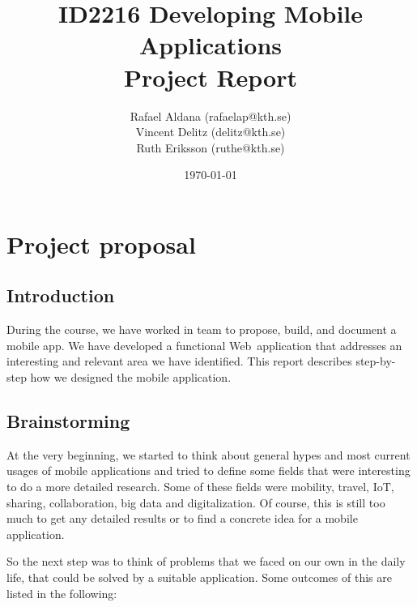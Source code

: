 \documentclass[11pt,twoside,a4paper]{report}
\newcommand{\webOrNative}{Web~}
\begin{document}
\title{ID2216 Developing Mobile Applications\\Project Report}
\author{Rafael Aldana (rafaelap@kth.se)\\Vincent Delitz (delitz@kth.se)\\Ruth Eriksson (ruthe@kth.se)}
\date{\today}
\maketitle

\newpage


\tableofcontents



\newpage

\chapter{Project proposal}

\section{Introduction}

During the course, we have worked in team to propose, build, and document a mobile app. We have developed a functional \webOrNative application that addresses an interesting and relevant area we have identified. This report describes step-by-step how we designed the mobile application.

\section{Brainstorming}

At the very beginning, we started to think about general hypes and most current usages of mobile applications and tried to define some fields that were interesting to do a more detailed research. Some of these fields were mobility, travel, IoT, sharing, collaboration, big data and digitalization. Of course, this is still too much to get any detailed results or to find a concrete idea for a mobile application.

So the next step was to think of problems that we faced on our own in the daily life, that could be solved by a suitable application. Some outcomes of this are listed in the following:
\end{document}
